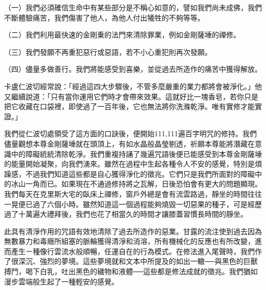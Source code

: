（一）我們必須確信生命中有某些部分是不稱心如意的，譬如我們尚未成佛，我們不斷體驗痛苦，我們傷害了他人，為他人付出犧牲的不夠等等。

（二）我們利用最快速的金剛乗的法門來清除罪業，例如金剛薩埵的禪修。

（三）我們發願不再重犯惡行或惡語，若不小心重犯則再次發願。

（四）儘量多做善行。我們將能感受到喜樂，並從過去所造作的痛苦中獲得解放。

卡盧仁波切經常說：「經過這四大步驟後，不管多麼嚴重的業力都將會被淨化。」他又繼續說道：「只有當你運用它們時才會帶來效果。這就好比一塊香皂，若你只是把它收藏在口袋裡，即使過了一百年後，它也無法將你洗滌乾淨。唯有實修才能實證。」

我們從仁波切處領受了這方面的口訣後，便開始111,111遍百字明咒的修持。我們儘量觀想本尊金剛薩埵就在頭頂上，有如水晶般晶瑩剔透，祈願本尊能將潛藏在意識中的障礙統統清除乾淨。我們重複持誦了幾遍咒語後便已能感受到本尊金剛薩埵的能量開始凝聚，向我們湧來。雖然在過程中生起各種令人不安的感覺，特別是煩躁感，不過我們知道這些都是自心獲得淨化的徵兆。它們只是我們所面對的障礙中的冰山一角而已。如果現在不通過修持將之瓦解，日後恐怕會有更大的問題顯現。我們每天在克里斯大宅的臥床上禪修，窗戶外總是會有流雲路過，靜坐的時間往往一晃便已過了六個小時。雖然知道這一個過程能夠燒毀一切惡果的種子，可是經歷過了十萬遍大禮拜後，我們也花了相當久的時間才讓膝蓋習慣長時間的靜坐。

此具有清淨作用的咒語有效地清除了過去所造作的惡業。甘露的流注使到過去因為無數暴力和毒癮所組塞的脈輪獲得清淨和消溶，所有機械化的反應也有所改變，進而產生ㄧ種像行雲流水般順暢，任運自在的行為模式。在修法進入尾聲時，我們作了很深沉、強烈的夢境。這些夢境就和文本中所提及的如出一轍──與黑色的巨獸搏鬥，喝下白乳，吐出黑色的穢物和液體──這些都是修法成就的徵兆。我們猶如漫步雲端般生起了一種輕安的感覺。
